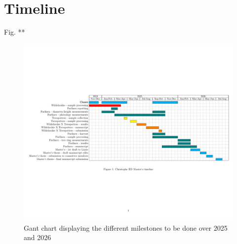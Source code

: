 \documentclass{article}
\begin{document}
\section{Timeline} 
Fig. **
\begin{figure}[h]
\includegraphics[width=1.1\textwidth]{ganttChart.pdf}
\caption{Gant chart displaying the different milestones to be done over 2025 and 2026}
\label{fig:sample}
\end{figure}

\end{document}
